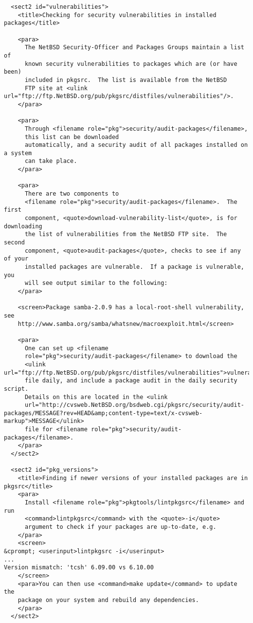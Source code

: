 \begin{verbatim}
  <sect2 id="vulnerabilities">
    <title>Checking for security vulnerabilities in installed packages</title>

    <para>
      The NetBSD Security-Officer and Packages Groups maintain a list of
      known security vulnerabilities to packages which are (or have been)
      included in pkgsrc.  The list is available from the NetBSD
      FTP site at <ulink url="ftp://ftp.NetBSD.org/pub/pkgsrc/distfiles/vulnerabilities"/>.
    </para>

    <para>
      Through <filename role="pkg">security/audit-packages</filename>,
      this list can be downloaded
      automatically, and a security audit of all packages installed on a system
      can take place.
    </para>

    <para>
      There are two components to
      <filename role="pkg">security/audit-packages</filename>.  The first
      component, <quote>download-vulnerability-list</quote>, is for downloading
      the list of vulnerabilities from the NetBSD FTP site.  The second
      component, <quote>audit-packages</quote>, checks to see if any of your
      installed packages are vulnerable.  If a package is vulnerable, you
      will see output similar to the following:
    </para>

    <screen>Package samba-2.0.9 has a local-root-shell vulnerability, see
    http://www.samba.org/samba/whatsnew/macroexploit.html</screen>

    <para>
      One can set up <filename
      role="pkg">security/audit-packages</filename> to download the
      <ulink url="ftp://ftp.NetBSD.org/pub/pkgsrc/distfiles/vulnerabilities">vulnerabilities</ulink>
      file daily, and include a package audit in the daily security script.
      Details on this are located in the <ulink
      url="http://cvsweb.NetBSD.org/bsdweb.cgi/pkgsrc/security/audit-packages/MESSAGE?rev=HEAD&amp;content-type=text/x-cvsweb-markup">MESSAGE</ulink>
      file for <filename role="pkg">security/audit-packages</filename>.
    </para>
  </sect2>

  <sect2 id="pkg_versions">
    <title>Finding if newer versions of your installed packages are in pkgsrc</title>
    <para>
      Install <filename role="pkg">pkgtools/lintpkgsrc</filename> and run
      <command>lintpkgsrc</command> with the <quote>-i</quote>
      argument to check if your packages are up-to-date, e.g.
    </para>
    <screen>
&cprompt; <userinput>lintpkgsrc -i</userinput>
...
Version mismatch: 'tcsh' 6.09.00 vs 6.10.00
    </screen>
    <para>You can then use <command>make update</command> to update the
    package on your system and rebuild any dependencies.
    </para>
  </sect2>


\end{verbatim}
